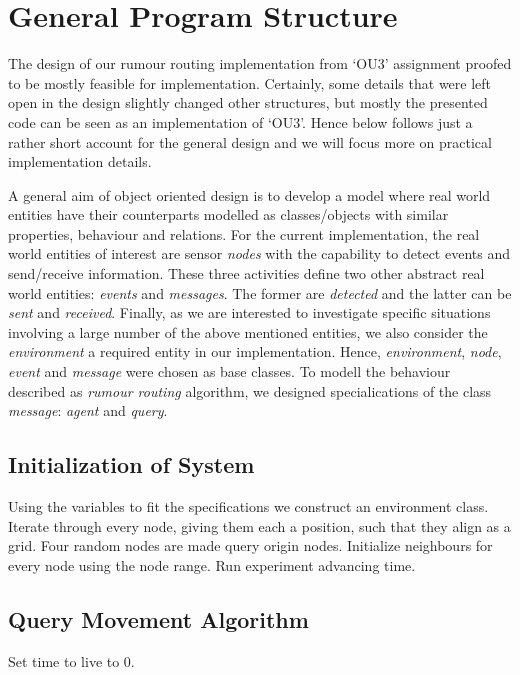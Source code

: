\documentclass[a4paper,11pt,twoside]{article}
\begin{document}
\section{General Program Structure}
The design of our rumour routing implementation from `OU3' assignment
proofed to be mostly feasible for implementation. Certainly, some
details that were left open in the design slightly changed other
structures, but mostly the presented code can be seen as
an implementation of `OU3'. Hence below follows just a rather short
account for the general design and we will focus more on practical
implementation details.

A general aim of object oriented design is to develop a model where
real world entities have their counterparts modelled as classes/objects
with similar properties, behaviour and relations. For the current
implementation, the real world entities of interest are sensor
\textit{nodes} with the capability to detect events and send/receive
information. These three activities define two other abstract real
world entities: \textit{events} and \textit{messages}. The former are
\textit{detected} and the latter can be \textit{sent} and \textit{received}. 
Finally, as we are interested to investigate specific
situations involving a large number of the above mentioned entities,
we also consider the \textit{environment} a required entity in our
implementation. Hence, \textit{environment}, \textit{node},
\textit{event} and \textit{message} were chosen as base
classes. To modell the behaviour described as \textit{rumour routing}
algorithm, we designed specialications of the class \textit{message}:
\textit{agent} and \textit{query}.

\subsection{Initialization of System}
\noindent Using the variables to fit the specifications we construct an
environment class. Iterate through every node, giving them each a
position, such that they align as a grid. Four random nodes are made
query origin nodes. Initialize neighbours for every node using the
node range. Run experiment advancing time.

\subsection{Query Movement Algorithm}
\noindent Set time to live to 0.
\end{document}
